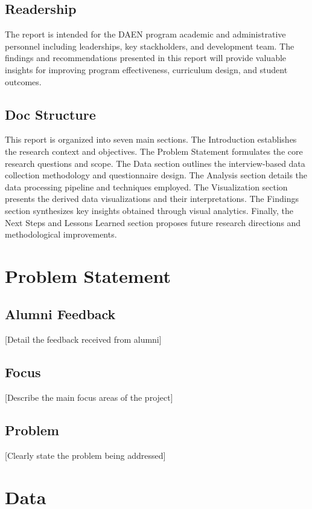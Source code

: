 \documentclass[12pt,a4paper]{article}
\begin{document}
\subsection{Readership}
The report is intended for the DAEN program academic and 
administrative personnel including leaderships, key stackholders, 
and development team. The findings and recommendations presented 
in this report will provide valuable insights for improving program 
effectiveness, curriculum design, and student outcomes.

\subsection{Doc Structure}
This report is organized into seven main sections. The Introduction 
establishes the research context and objectives. The Problem 
Statement formulates the core research questions and scope. 
The Data section outlines the interview-based data collection 
methodology and questionnaire design. The Analysis section 
details the data processing pipeline and techniques employed. 
The Visualization section presents the derived data visualizations 
and their interpretations. The Findings section synthesizes key 
insights obtained through visual analytics. Finally, the Next 
Steps and Lessons Learned section proposes future research 
directions and methodological improvements.

\section{Problem Statement}
\subsection{Alumni Feedback}
[Detail the feedback received from alumni]

\subsection{Focus}
[Describe the main focus areas of the project]

\subsection{Problem}
[Clearly state the problem being addressed]

\section{Data}
\end{document}
